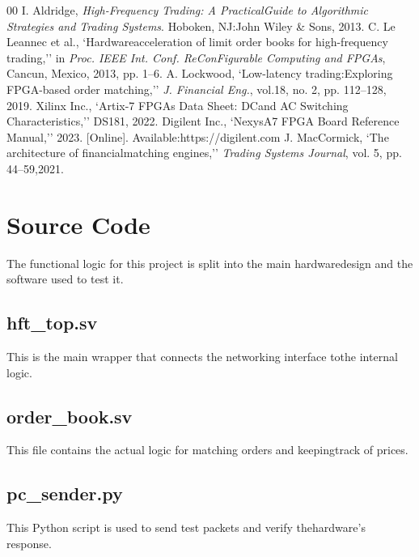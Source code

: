 \documentclass[conference,a4paper]{IEEEtran}
\begin{document}
\begin{thebibliography}{00}
 I. ​Aldridge, \textit{High-Frequency ​Trading: ​A Practical ​Guide​ to ​Algorithmic ​Strategies​ and ​Trading ​Systems}. ​Hoboken, ​NJ: ​John ​Wiley \& Sons, ​2013.
 C. ​Le ​Leannec​ et​ al., `Hardware​ acceleration​ of​ limit​ order​ books​ for​ high-frequency​ trading,'' in \textit{Proc. ​IEEE ​Int. ​Conf. ​ReConFigurable ​Computing​ and ​FPGAs}, ​Cancun, ​Mexico, ​2013, ​pp. ​1--6.
 A. ​Lockwood, `Low-latency​ trading: ​Exploring ​FPGA-based​ order​ matching,'' \textit{J. ​Financial ​Eng.}, ​vol. ​18, ​no. ​2, ​pp. ​112--128, ​2019.
 Xilinx ​Inc., `Artix-7 ​FPGAs ​Data ​Sheet: ​DC ​and ​AC ​Switching ​Characteristics,'' DS181, ​2022.
 Digilent ​Inc., `Nexys ​A7 ​FPGA ​Board ​Reference ​Manual,'' 2023. [Online]. ​Available: ​https://digilent.com
 J. ​MacCormick, `The​ architecture​ of​ financial​ matching​ engines,'' \textit{Trading ​Systems ​Journal}, ​vol. ​5, ​pp. ​44--59, ​2021.
\end{thebibliography}



\section{Source ​Code}
The ​functional ​logic ​for ​this ​project ​is ​split ​into ​the ​main ​hardware ​design ​and ​the ​software ​used ​to ​test ​it.

\subsection{hft\_top.sv}
This ​is ​the ​main ​wrapper ​that ​connects ​the ​networking ​interface ​to ​the ​internal ​logic.


\subsection{order\_book.sv}
This ​file ​contains ​the ​actual ​logic ​for ​matching ​orders ​and ​keeping ​track ​of ​prices.


\subsection{pc\_sender.py}
This ​Python ​script ​is ​used ​to ​send ​test ​packets ​and ​verify ​the ​hardware's ​response.

\end{document}
